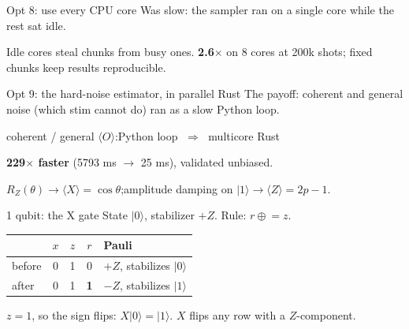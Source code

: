 \documentclass[aspectratio=169]{beamer}
\begin{document}
\begin{frame}{Opt 8: use every CPU core}
  \alert{Was slow:} the sampler ran on a single core while the rest sat idle.
  \vfill
  \begin{center}
  \end{center}
  \vfill
  \begin{center}\large Idle cores steal chunks from busy ones. \textbf{2.6$\times$} on 8 cores at 200k shots; fixed chunks keep results reproducible.\end{center}
\end{frame}

\begin{frame}{Opt 9: the hard-noise estimator, in parallel Rust}
  \alert{The payoff:} coherent and general noise (which stim cannot do) ran as a slow Python loop.
  \vfill
  \begin{center}\Large coherent / general $\langle O\rangle$:\quad Python loop $\;\Longrightarrow\;$ multicore Rust\end{center}
  \vfill
  \begin{center}\Large \textbf{229$\times$ faster} (5793 ms $\to$ 25 ms), validated unbiased.\end{center}
  \par\footnotesize $R_Z(\theta) \to \langle X\rangle = \cos\theta$;\quad amplitude damping on $|1\rangle \to \langle Z\rangle = 2p-1$.
\end{frame}


\begin{frame}{1 qubit: the X gate}
  State $|0\rangle$, stabilizer $+Z$. Rule: $r \mathrel{\oplus}= z$.
  \vfill
  \begin{center}\large
  \begin{tabular}{lcccl}
    \toprule
     & $x$ & $z$ & $r$ & Pauli \\
    \midrule
    before & 0 & 1 & 0 & $+Z$, stabilizes $|0\rangle$ \\
    after  & 0 & 1 & \textbf{1} & $-Z$, stabilizes $|1\rangle$ \\
    \bottomrule
  \end{tabular}
  \end{center}
  \vfill
  \begin{center}\small $z=1$, so the sign flips: $X|0\rangle=|1\rangle$. $X$ flips any row with a $Z$-component.\end{center}
\end{frame}
\end{document}
